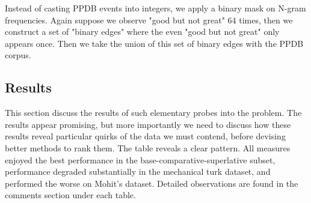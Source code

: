Instead of casting PPDB events into integers, we apply a binary mask on N-gram frequencies. Again suppose we observe "good but not great" 64 times, then we construct a set of "binary edges" where the even "good but not great" only appears once. Then we take the union of this set of binary edges with the PPDB corpus. 


\subsection{Results}

This section discuss the results of such elementary probes into the problem. The results appear promising, but more importantly we need to discuss how these results reveal particular quirks of the data we must contend, before devising better methods to rank them. The table reveals a clear pattern. All measures enjoyed the best performance in the base-comparative-superlative subset, performance degraded substantially in the mechanical turk dataset, and performed the worse on Mohit's dataset. Detailed observations are found in the comments section under each table.


